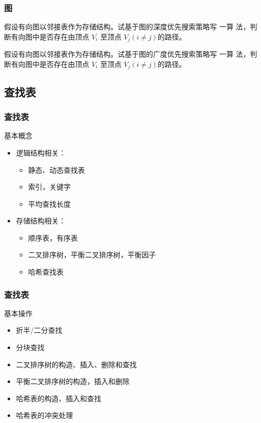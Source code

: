 \documentclass{beamer}
\begin{document}
    \begin{frame}
        \frametitle{图}
        \begin{block}{7.9}
            假设有向图以邻接表作为存储结构。试基于图的深度优先搜索策略写 一算 法，判断有向图中是否存在由顶点 $V_i$ 至顶点 $V_j(i\neq j)$的路径。
        \end{block}
        \begin{block}{}
            假设有向图以邻接表作为存储结构。试基于图的广度优先搜索策略写 一算 法，判断有向图中是否存在由顶点 $V_i$ 至顶点 $V_j(i\neq j)$的路径。
        \end{block}
    \end{frame}

    \subsection{查找表}
    \begin{frame}
        \frametitle{查找表}
        \begin{block}{基本概念}
            \begin{itemize}
                \item<1-> 逻辑结构相关：
                \begin{itemize}
                    \item<2-> 静态、动态查找表
                    \item<3-> 索引，关键字
                    \item<4-> 平均查找长度
                \end{itemize}
                \item<5-> 存储结构相关：
                \begin{itemize}
                    \item<6-> 顺序表，有序表
                    \item<7-> 二叉排序树，平衡二叉排序树，平衡因子
                    \item<8-> 哈希查找表
                \end{itemize}
            \end{itemize}
        \end{block}
    \end{frame}


    \begin{frame}
        \frametitle{查找表}
        \begin{block}{基本操作}
            \begin{itemize}
                \item<1-> 折半/二分查找
                \item<2-> 分块查找
                \item<3-> 二叉排序树的构造、插入、删除和查找
                \item<4-> 平衡二叉排序树的构造，插入和删除
                \item<5-> 哈希表的构造、插入和查找
                \item<6-> 哈希表的冲突处理
            \end{itemize}
        \end{block}
    \end{frame}
\end{document}
